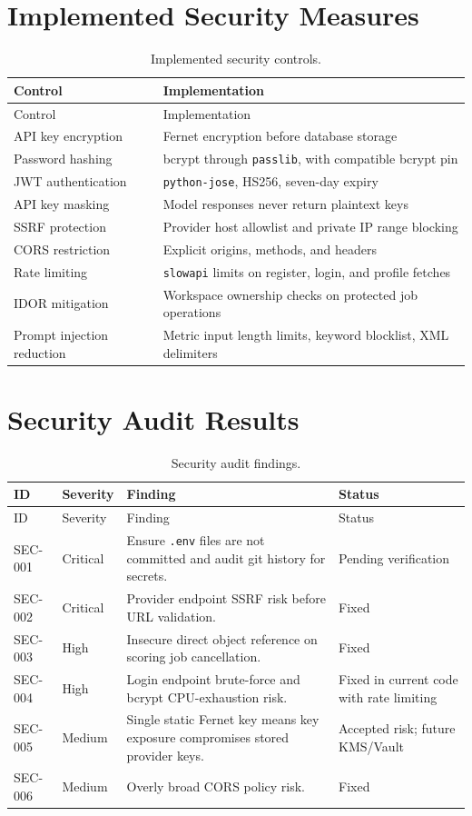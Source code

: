 \documentclass[12pt,a4paper]{report}
\begin{document}
\section{Implemented Security Measures}
\begin{longtable}{p{}p{}}
\caption{Implemented security controls.}\\
\toprule
Control & Implementation \\
\midrule
\endfirsthead
\toprule
Control & Implementation \\
\midrule
\endhead
API key encryption & Fernet encryption before database storage \\
Password hashing & bcrypt through \texttt{passlib}, with compatible bcrypt pin \\
JWT authentication & \texttt{python-jose}, HS256, seven-day expiry \\
API key masking & Model responses never return plaintext keys \\
SSRF protection & Provider host allowlist and private IP range blocking \\
CORS restriction & Explicit origins, methods, and headers \\
Rate limiting & \texttt{slowapi} limits on register, login, and profile fetches \\
IDOR mitigation & Workspace ownership checks on protected job operations \\
Prompt injection reduction & Metric input length limits, keyword blocklist, XML delimiters \\
\bottomrule
\end{longtable}

\section{Security Audit Results}
\begin{longtable}{p{}p{}p{}p{}}
\caption{Security audit findings.}\\
\toprule
ID & Severity & Finding & Status \\
\midrule
\endfirsthead
\toprule
ID & Severity & Finding & Status \\
\midrule
\endhead
SEC-001 & Critical & Ensure \texttt{.env} files are not committed and audit git history for secrets. & Pending verification \\
SEC-002 & Critical & Provider endpoint SSRF risk before URL validation. & Fixed \\
SEC-003 & High & Insecure direct object reference on scoring job cancellation. & Fixed \\
SEC-004 & High & Login endpoint brute-force and bcrypt CPU-exhaustion risk. & Fixed in current code with rate limiting \\
SEC-005 & Medium & Single static Fernet key means key exposure compromises stored provider keys. & Accepted risk; future KMS/Vault \\
SEC-006 & Medium & Overly broad CORS policy risk. & Fixed \\
\bottomrule
\end{longtable}
\end{document}
